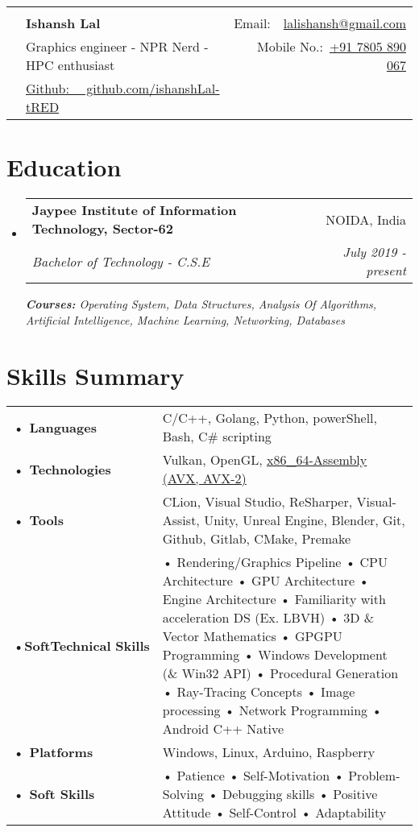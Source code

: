 \documentclass[a4paper,10pt]{article}
\makeatletter
\newcommand{\resumeSubheading}[4]{
  \vspace{-1pt}\item
    \begin{tabular*}{0.97\textwidth}{l@{\extracolsep{\fill}}r}
      \textbf{#1} & #2 \\
      \textit{#3} & \textit{#4} \\
    \end{tabular*}\vspace{-5pt}
}
\newcommand{\resumeSubHeadingListStart}{\begin{itemize}[leftmargin=*]}
\newcommand{\resumeSubHeadingListEnd}{\end{itemize}}
\newcommand{\photo}[1]{\begin{tikzpicture}\clip (0,0) circle (1.1cm) node {\texttt{[image: \#1]}};\end{tikzpicture}}
\makeatother
\begin{document}
\begin{tabular*}{\textwidth}{c l@{\extracolsep{\fill}}r}
  \multirow{4}{*}{\photo{me-cropped}} \\
   & \textbf{{\LARGE Ishansh Lal}} & Email:~~\href{mailto:}{lalishansh@gmail.com}\\
   & Graphics engineer - NPR Nerd - HPC enthusiast & Mobile No.:~\href{tel:917805890067}{+91 7805 890 067}\\
   & \href{https://github.com/ishanshLal-tRED}{Github: ~~github.com/ishanshLal-tRED} \\
\end{tabular*}
\section{Education}
  \resumeSubHeadingListStart
    \resumeSubheading
      {Jaypee Institute of Information Technology, Sector-62}{NOIDA, India}
      {Bachelor of Technology - C.S.E}{July 2019 - present}
      {\scriptsize \textit{ \footnotesize{\newline{}\textbf{Courses:} Operating System, Data Structures, Analysis Of Algorithms, Artificial Intelligence, Machine Learning, Networking, Databases}}}\\
    \resumeSubHeadingListEnd
\vspace{-6pt}
\section{Skills Summary}
\begin{tabular}{p{}p{}}
    \textbf{• Languages}&{C/C++, Golang, Python, powerShell, Bash, C\# scripting}\\
    \textbf{• Technologies}&{Vulkan, OpenGL, \url{x86_64-Assembly (AVX, AVX-2)}}\\
    \textbf{• Tools}&{CLion, Visual Studio, ReSharper, Visual-Assist, Unity, Unreal Engine, Blender, Git, Github, Gitlab, CMake, Premake}\\
    \textbf{•\hspace{5pt}SoftTechnical\hspace{15pt}\textcolor{white}{!}\hspace{7pt}Skills}&{• Rendering/Graphics Pipeline • CPU Architecture • GPU Architecture • Engine Architecture • Familiarity with acceleration DS (Ex. LBVH) • 3D \& Vector Mathematics • GPGPU Programming • Windows Development (\& Win32 API) • Procedural Generation • Ray-Tracing Concepts • Image processing • Network Programming • Android C++ Native}\\
    \textbf{• Platforms}&{Windows, Linux, Arduino, Raspberry}\\
    \textbf{• Soft Skills}&{• Patience • Self-Motivation • Problem-Solving • Debugging skills • Positive Attitude • Self-Control • Adaptability}
\end{tabular}
\vspace{-2pt}
\end{document}
